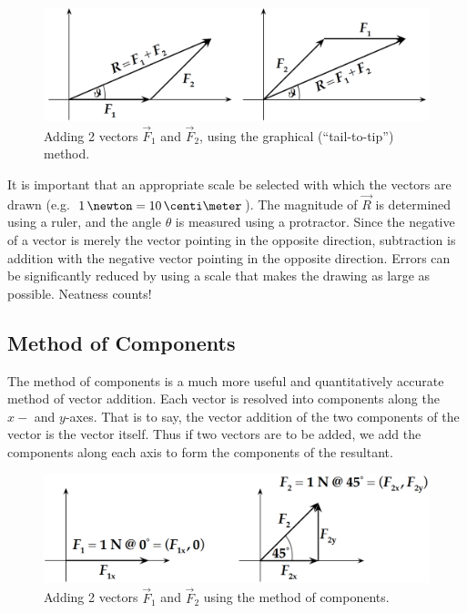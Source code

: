 \begin{figure}%
  \begin{center}
    \includegraphics[width=5.6in]{Experiment01Figures/M1_ForceTable_02.png}
  \end{center}
  \caption{Adding 2 vectors $\vec{F}_1$ and $\vec{F}_2$, using the graphical (``tail-to-tip'') method.}
  \label{M01Fig02}
\end{figure}

It is important that an appropriate scale be selected with which the vectors are drawn (e.g.\ $1\,\newton = 10\,\centi\meter$). The magnitude of $\vec{R}$ is determined using a ruler, and the angle $\theta$ is measured using a protractor.  Since the negative of a vector is merely the vector pointing in the opposite direction, subtraction is addition with the negative vector pointing in the opposite direction.  Errors can be significantly reduced by using a scale that makes the drawing as large as possible. Neatness counts!

\subsection{Method of Components}

The method of components is a much more useful and quantitatively accurate method of vector addition.  Each vector is resolved into components along the $x-$ and $y$-axes. That is to say, the vector addition of the two components of the vector is the vector itself.  Thus if two vectors are to be added, we add the components along each axis to form the components of the resultant.

\begin{figure}[ht]
  \begin{center}
    \includegraphics[width=5.6in]{Fall/Experiment01Figures/M1_ForceTable_03.png}
  \end{center}
  \caption{Adding 2 vectors $\vec{F}_1$ and $\vec{F}_2$ using the method of components. }
  \label{M01Fig03}
\end{figure}

